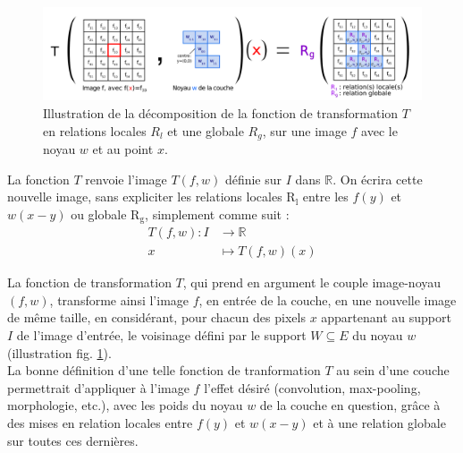 \newpage

\begin{figure}[ht]
  \begin{center}
    \includegraphics[width=1.00\textwidth]{parts/2-etat_de_lart/B-structure_des_reseaux_morphologiques/figures/couche_morpho.pdf}
    \caption{ \centering Illustration de la décomposition de la fonction de transformation $T$ en relations locales $R_l$ et une globale $R_g$, sur une image $f$ avec le noyau $w$ et au point $x$.}
    \label{fig:structure_couche_morpho}
  \end{center}
\end{figure}

\vspace{-1.8mm}
\noindent La fonction $T$ renvoie l'image $T(f,w)$ définie sur $I$ dans $\mathbb{R}$. On écrira cette nouvelle image, sans expliciter les relations locales $\text{R}_\text{l}$ entre les $f(y)$ et $w(x-y)$ ou globale $\text{R}_\text{g}$, simplement comme suit :
\vspace{-2.6mm}
\begin{align*}
T(f,w) \colon I & \longrightarrow \mathbb{R}\\
x & \longmapsto T \left ( f, w \right ) (x)
\end{align*}

\vspace{1.0mm}
\noindent La fonction de transformation $T$, qui prend en argument le couple image-noyau $(f,w)$, transforme ainsi l'image $f$, en entrée de la couche, en une nouvelle image de même taille, en considérant, pour chacun des pixels $x$ appartenant au support $I$ de l'image d'entrée, le voisinage défini par le support $W \subseteq E$ du noyau $w$ (illustration fig. \ref{fig:structure_couche_morpho}). \\

La bonne définition d'une telle fonction de tranformation $T$ au sein d'une couche permettrait d'appliquer à l'image $f$ l'effet désiré (convolution, max-pooling, morphologie, etc.), avec les poids du noyau $w$ de la couche en question, grâce à des mises en relation locales entre $f(y)$ et $w(x-y)$ et à une relation globale sur toutes ces dernières. \\

